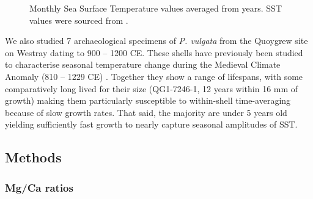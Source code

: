 \documentclass[
  authoryear,
  preprint,
  3p]{elsarticle}
\begin{document}
\begin{figure}[H]


\caption{\label{fig-SSTs}Monthly Sea Surface Temperature values averaged
from years. SST values were sourced from \citet{Good2020-nl}.}

\end{figure}%

We also studied 7 archaeological specimens of \emph{P. vulgata} from the
Quoygrew site on Westray dating to 900 -- 1200 CE. These shells have
previously been studied to characterise seasonal temperature change
during the Medieval Climate Anomaly (810 -- 1229 CE)
\citep{Surge2012-ba}. Together they show a range of lifespans, with some
comparatively long lived for their size (QG1-7246-1, 12 years within 16
mm of growth) making them particularly susceptible to within-shell
time-averaging because of slow growth rates. That said, the majority are
under 5 years old yielding sufficiently fast growth to nearly capture
seasonal amplitudes of SST.

\subsection{Methods}\label{methods}

\subsubsection{Mg/Ca ratios}\label{mgca-ratios}
\end{document}
